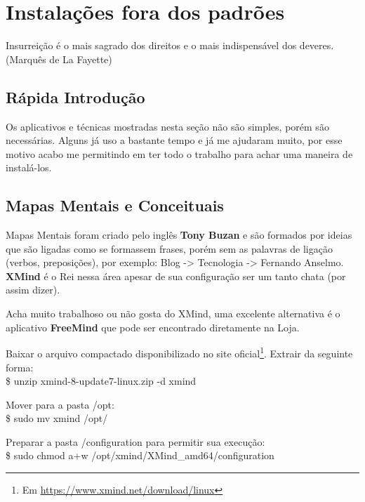 \chapter{Instalações fora dos padrões}

\begin{remark}
Insurreição é o mais sagrado dos direitos e o mais indispensável dos deveres. (Marquês de La Fayette)
\end{remark}

\section{Rápida Introdução}
Os aplicativos e técnicas mostradas nesta seção não são simples, porém são necessárias. Alguns já uso a bastante tempo e já me ajudaram muito, por esse motivo acabo me permitindo em ter todo o trabalho para achar uma maneira de instalá-los.

\section{Mapas Mentais e Conceituais}
Mapas Mentais foram criado pelo inglês \textbf{Tony Buzan} e são formados por ideias que são ligadas como se formassem frases, porém sem as palavras de ligação (verbos, preposições), por exemplo: Blog -> Tecnologia -> Fernando Anselmo. \textbf{XMind} é o Rei nessa área apesar de sua configuração ser um tanto chata (por assim dizer). \\[3mm]
\begin{dica}[Alternativa] Acha muito trabalhoso ou não gosta do XMind, uma excelente alternativa é o aplicativo \textbf{FreeMind} que pode ser encontrado diretamente na Loja.
\end{dica}

Baixar o arquivo compactado disponibilizado no site oficial\footnote{Em \url{https://www.xmind.net/download/linux}}. Extrair da seguinte forma: \\
{\ttfamily\$ unzip xmind-8-update7-linux.zip -d xmind}

Mover para a pasta /opt: \\
{\ttfamily\$ sudo mv xmind /opt/}

Preparar a pasta /configuration para permitir sua execução: \\
{\ttfamily\$ sudo chmod a+w /opt/xmind/XMind\_amd64/configuration}

